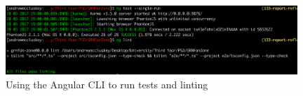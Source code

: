 \begin{figure}[H]
\begin{center}
\includegraphics[width=11cm]{figures/frontend_ng_cli}
\end{center}
\caption{Using the Angular CLI to run tests and linting}
\label{fig:frontend_ng_cli}
\end{figure}
